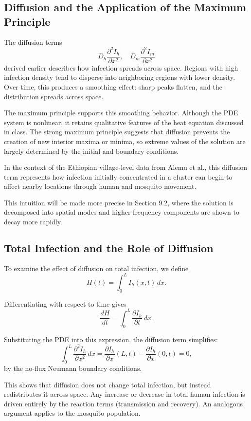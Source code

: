 \documentclass[12pt]{article}
\begin{document}
\subsection{Diffusion and the Application of the Maximum Principle}

The diffusion terms
\[
D_h \frac{\partial^2 I_h}{\partial x^2}, \quad D_m \frac{\partial^2 I_m}{\partial x^2}
\]
derived earlier describes how infection spreads across space. Regions with high infection density tend to disperse into neighboring regions with lower density. Over time, this produces a smoothing effect: sharp peaks flatten, and the distribution spreads across space. 

The maximum principle supports this smoothing behavior. Although the PDE system is nonlinear, it retains qualitative features of the heat equation discussed in class. The strong maximum principle suggests that diffusion prevents the creation of new interior maxima or minima, so extreme values of the solution are largely determined by the initial and boundary conditions.

In the context of the Ethiopian village-level data from Alemu et al., this diffusion term represents how infection initially concentrated in a cluster can begin to affect nearby locations through human and mosquito movement. 

This intuition will be made more precise in Section 9.2, where the solution is decomposed into spatial modes and higher-frequency components are shown to decay more rapidly.

\subsection{Total Infection and the Role of Diffusion}

To examine the effect of diffusion on total infection, we define
\[
H(t) = \int_0^L I_h(x,t)\,dx.
\]

Differentiating with respect to time gives
\[
\frac{dH}{dt} = \int_0^L \frac{\partial I_h}{\partial t}\,dx.
\]

Substituting the PDE into this expression, the diffusion term simplifies:
\[
\int_0^L \frac{\partial^2 I_h}{\partial x^2} \, dx
= \frac{\partial I_h}{\partial x}(L,t) - \frac{\partial I_h}{\partial x}(0,t) = 0,
\]
by the no-flux Neumann boundary conditions.

This shows that diffusion does not change total infection, but instead redistributes it across space. Any increase or decrease in total human infection is driven entirely by the reaction terms (transmission and recovery). An analogous argument applies to the mosquito population.
\end{document}
